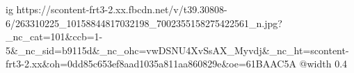  
 
 
 
 

\ifcmt
  ig https://scontent-frt3-2.xx.fbcdn.net/v/t39.30808-6/263310225_10158844817032198_7002355158275422561_n.jpg?_nc_cat=101&ccb=1-5&_nc_sid=b9115d&_nc_ohc=vwDSNU4XvSsAX_Myvdj&_nc_ht=scontent-frt3-2.xx&oh=0dd85c653ef8aad1035a811aa860829e&oe=61BAAC5A
  @width 0.4
\fi
